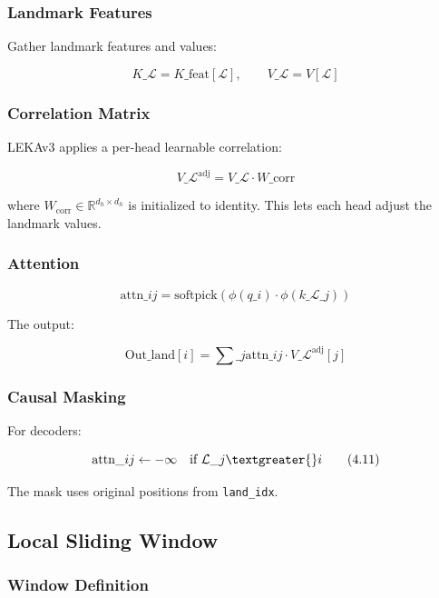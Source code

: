 \subsubsection{Landmark Features}

Gather landmark features and values:

\[
K\_\mathcal{L} = K\_\text{feat}[\mathcal{L}], \qquad V\_\mathcal{L} = V[\mathcal{L}]
\tag{4.7}
\]

\subsubsection{Correlation Matrix}

LEKAv3 applies a per-head learnable correlation:

\[
V\_\mathcal{L}^\text{adj} = V\_\mathcal{L} \cdot W\_\text{corr}
\tag{4.8}
\]

where $W_\text{corr} \in \mathbb{R}^{d_h \times d_h}$ is initialized to 
identity. This lets each head adjust the landmark values.

\subsubsection{Attention}

\[
\text{attn}\_{ij} = \text{softpick}\!\left(\phi(q\_i) \cdot \phi(k\_{\mathcal{L}\_j})\right)
\tag{4.9}
\]

The output:

\[
\text{Out}\_\text{land}[i] = \sum\_j \text{attn}\_{ij} \cdot V\_\mathcal{L}^\text{adj}[j]
\tag{4.10}
\]

\subsubsection{Causal Masking}

For decoders:

\[
\text{attn}\_{ij} \leftarrow -\infty \quad \text{if } \mathcal{L}\_j \textgreater{} i
\tag{4.11}
\]

The mask uses original positions from \texttt{land\_idx}.

\subsection{Local Sliding Window}

\subsubsection{Window Definition}

